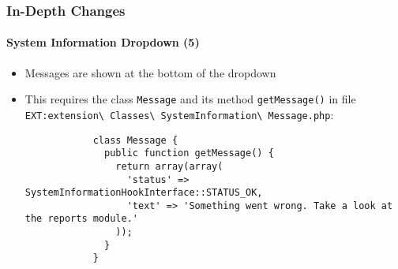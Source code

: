 \begin{frame}[fragile]
	\frametitle{In-Depth Changes}
	\framesubtitle{System Information Dropdown (5)}

	\lstset{basicstyle=\tiny\ttfamily}

	\begin{itemize}

		\item Messages are shown at the bottom of the dropdown

		\item This requires the class \texttt{Message} and its method \texttt{getMessage()} in file
			\small
				\texttt{EXT:extension\textbackslash
					Classes\textbackslash
					SystemInformation\textbackslash
					Message.php}:
			\normalsize

		\begin{lstlisting}
			class Message {
			  public function getMessage() {
			    return array(array(
			      'status' => SystemInformationHookInterface::STATUS_OK,
			      'text' => 'Something went wrong. Take a look at the reports module.'
			    ));
			  }
			}
		\end{lstlisting}

	\end{itemize}

\end{frame}


